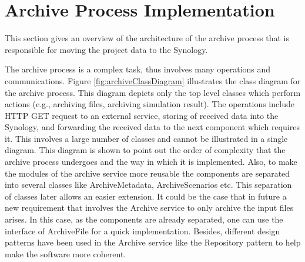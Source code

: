 \section{Archive Process Implementation}
This section gives an overview of the architecture of the archive process that is responsible
for moving the project data to the Synology. 

The archive process is a complex 
task, thus involves many operations and communications. Figure \ref{fig:archiveClassDiagram} illustrates the class diagram for the archive process. This diagram depicts only the top level classes
which perform actions (e.g., archiving files, archiving simulation result). The operations include HTTP GET request to an external service, storing of received
data into the Synology, and forwarding the received data to the next component which requires it. This involves a large number of classes and cannot be 
illustrated in a single diagram. This diagram is shown to point out the order of complexity that the archive process undergoes and the way in which it is
implemented. Also, to make the modules of the archive service more reusable the components are separated into several classes
like ArchiveMetadata, ArchiveScenarios etc. This separation
of classes later allows an easier extension. It could be the case that in future a new requirement
that involves the Archive service to only archive
the input files arises. In this case, as the components are already separated, one can use the interface of ArchiveFile for a quick implementation. 
Besides, different design patterns have been used
in the Archive service like the Repository pattern \cite{repo} to help make the software more coherent.
 
